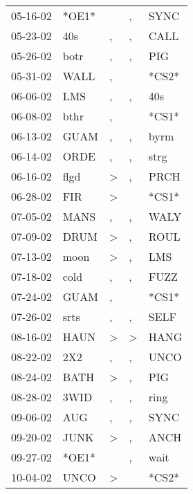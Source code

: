 \begin{supertabular}{lllll}
 05-16-02 &  *OE1* &                  &             , &   SYNC \\
 05-23-02 &    40s &                , &             , &   CALL \\
 05-26-02 &   botr &                , &             , &    PIG \\
 05-31-02 &   WALL &                , &               &  *CS2* \\
 06-06-02 &    LMS &                , &             , &    40s \\
 06-08-02 &   bthr &                , &               &  *CS1* \\
 06-13-02 &   GUAM &                , &             , &   byrm \\
 06-14-02 &   ORDE &                , &             , &   strg \\
 06-16-02 &   flgd &     \textgreater &             , &   PRCH \\
 06-28-02 &    FIR &     \textgreater &               &  *CS1* \\
 07-05-02 &   MANS &                , &             , &   WALY \\
 07-09-02 &   DRUM &     \textgreater &             , &   ROUL \\
 07-13-02 &   moon &     \textgreater &             , &    LMS \\
 07-18-02 &   cold &                , &             , &   FUZZ \\
 07-24-02 &   GUAM &                , &               &  *CS1* \\
 07-26-02 &   srts &                , &             , &   SELF \\
 08-16-02 &   HAUN &     \textgreater &  \textgreater &   HANG \\
 08-22-02 &    2X2 &                , &             , &   UNCO \\
 08-24-02 &   BATH &     \textgreater &             , &    PIG \\
 08-28-02 &   3WID &                , &             , &   ring \\
 09-06-02 &    AUG &                , &             , &   SYNC \\
 09-20-02 &   JUNK &     \textgreater &             , &   ANCH \\
 09-27-02 &  *OE1* &                  &             , &   wait \\
 10-04-02 &   UNCO &     \textgreater &               &  *CS2* \\

\end{supertabular}
